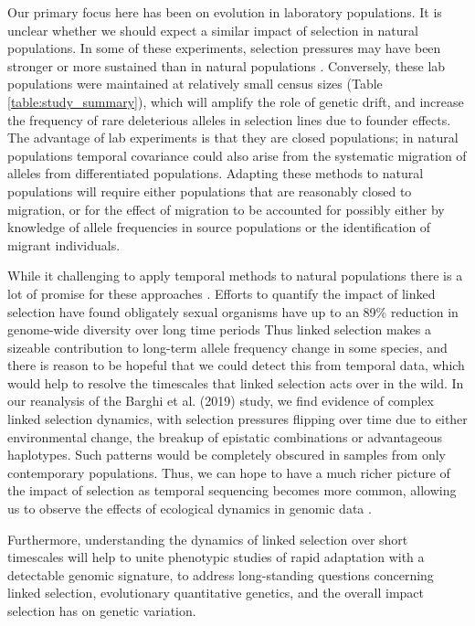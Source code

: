 \documentclass[9pt,twocolumn,twoside]{pnas-new}
\begin{document}
Our primary focus here has been on evolution in laboratory populations. It is
unclear whether we should expect a similar impact of selection in natural
populations. In some of these experiments, selection pressures may have been
stronger or more sustained than in natural populations
\cite{Hendry1999-zu,Hairston2005-ga}. Conversely, these lab populations were
maintained at relatively small census sizes (Table \ref{table:study_summary}),
which will amplify the role of genetic drift, and increase the frequency of
rare deleterious alleles in selection lines due to founder effects. The
advantage of lab experiments is that they are closed populations; in natural
populations temporal covariance could also arise from the systematic migration
of alleles from differentiated populations. Adapting these methods to natural
populations will require either populations that are reasonably closed to
migration, or for the effect of migration to be accounted for possibly either
by knowledge of allele frequencies in source populations or the identification
of migrant individuals. 

While it challenging to apply temporal methods to natural populations there is
a lot of promise for these approaches
\cite{Bergland2014-ij,Machado2018-cs}. Efforts to quantify the impact of
linked selection have found obligately sexual organisms have up to an 89\%
reduction in genome-wide diversity over long time periods
\cite{McVicker2009-ax,Elyashiv2016-vt,Corbett-Detig2015-gt,Coop2016-gx,Comeron2014-nh}
Thus linked selection makes a sizeable contribution to long-term allele
frequency change in some species, and there is reason to be hopeful that we
could detect this from temporal data, which would help to resolve the
timescales that linked selection acts over in the wild. In our
reanalysis of the Barghi et al. (2019) study, we find evidence of complex
linked selection dynamics, with selection pressures flipping over time due to
either environmental change, the breakup of epistatic combinations or
advantageous haplotypes. Such patterns would be completely obscured in samples
from only contemporary populations. Thus, we can hope to have a much
richer picture of the impact of selection as temporal sequencing becomes more
common, allowing us to observe the effects of ecological dynamics in genomic
data \cite{Hairston2005-ga}.

Furthermore, understanding the dynamics of linked selection over short
timescales will help to unite phenotypic studies of rapid adaptation with a
detectable genomic signature, to address long-standing questions concerning
linked selection, evolutionary quantitative genetics, and the overall impact
selection has on genetic variation. 
\end{document}
